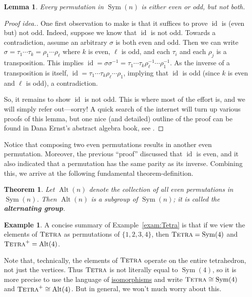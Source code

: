 \documentclass[11pt]{amsart}
\theoremstyle{plain}
\newtheorem*{theorem*}{Theorem}
\newtheorem*{lemma*}{Lemma}
\theoremstyle{definition}
\newtheorem{example}{Example}
\theoremstyle{remark}
\DeclareMathOperator{\Sym}{Sym}
\DeclareMathOperator{\Alt}{Alt}
\newcommand{\symtetra}{\textsc{Tetra}}
\newcommand{\rsymtetra}{\textsc{Tetra}^+}
\DeclareMathOperator{\id}{id}
\begin{document}
\begin{lemma*}
Every permutation in $\Sym(n)$ is either even or odd, but not both.
\end{lemma*}
\begin{proof}[Proof idea.]
One first observation to make is that it suffices to prove $\id$ is (even but) not odd. Indeed, suppose we know that $\id$ is not odd. Towards a contradiction, assume an arbitrary $\sigma$ is both even and odd. Then we can write $\sigma = \tau_1\cdots\tau_{k} = \rho_1\cdots\rho_{\ell}$ where $k$ is even, $\ell$ is odd, and each $\tau_i$ and each $\rho_j$ is a transposition. This implies  $\id = \sigma\sigma^{-1} = \tau_1\cdots\tau_{k}\rho_{\ell}^{-1}\cdots\rho_1^{-1}$. As the inverse of a transposition is itself, $\id  = \tau_1\cdots\tau_{k}\rho_{\ell}\cdots\rho_1$, implying that $\id$ is odd (since  $k$ is even and $\ell$ is odd), a contradiction.

So, it remains to show $\id$ is not odd. This is where most of the effort is, and we will simply refer out---sorry! A quick search of the internet will turn up various proofs of this lemma, but one nice (and  detailed) outline of the proof can be found in Dana Ernst's abstract algebra book, see \cite[Theorem 4.103]{ErD-Algebra}.
\end{proof}

Notice that composing two even permutations results in another even permutation. Moreover, the previous ``proof'' discussed that $\id$ is even, and it also indicated that a permutation has the same parity as its inverse. Combining this, we arrive at the following fundamental theorem-definition.

\begin{theorem*}
Let $\Alt(n)$ denote the collection of all even permutations in $\Sym(n)$. Then $\Alt(n)$ is a subgroup of $\Sym(n)$; it is called the \textbf{alternating group}.
\end{theorem*}

\begin{example}
A concise summary of Example~\ref{exam:Tetra} is that if we view the elements of $\symtetra$ as permutations of $\{1,2,3,4\}$, then $\symtetra = \Sym(4)$ and $\rsymtetra = \Alt(4)$. 

Note that, technically, the elements of $\symtetra$ operate on the entire tetrahedron, not just the vertices. Thus $\symtetra$ is not literally equal to $\Sym(4)$, so it is  more precise to use the language of \href{https://en.wikipedia.org/wiki/Isomorphism}{isomorphisms} and write $\symtetra \cong \Sym(4)$ and $\rsymtetra \cong \Alt(4)$. But in general, we won't much worry about this.
\end{example}
\end{document}

